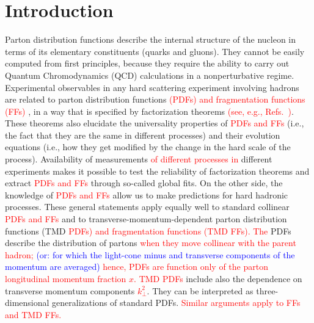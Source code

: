 \documentclass[aps,preprintnumbers,showpacs,nofootinbib,superscriptaddress,floatfix]{revtex4}
\newcommand{\T}{\perp}
\begin{document}

\maketitle

\section{Introduction}
\label{s:intro}

Parton distribution functions describe the internal structure of the nucleon
in terms of its elementary constituents (quarks and gluons). They cannot be
easily computed from first principles, because they require the ability to
carry out Quantum Chromodynamics (QCD) calculations in a nonperturbative
regime. Experimental observables in any hard scattering experiment
involving hadrons are related to parton distribution functions \textcolor{red}{(PDFs) and fragmentation functions (FFs)} , in a way that is specified by factorization theorems \textcolor{red}{(see, e.g., Refs.~\cite{Collins:1989gx,Collins:2011zzd})}. These theorems also elucidate the universality properties of \textcolor{red}{PDFs and FFs} (i.e., the fact that they are the same in different processes) and their evolution equations (i.e., how they get modified by the change in
the hard scale of the process). Availability of measurements \textcolor{red}{of different processes in} different
experiments makes it possible to test the reliability of factorization theorems and extract \textcolor{red}{PDFs and FFs} through so-called global fits. On the other side, the knowledge of \textcolor{red}{PDFs and FFs} allow us
to make predictions for hard hadronic processes. These general statements apply equally well to
standard collinear \textcolor{red}{PDFs and FFs} and to transverse-momentum-dependent parton distribution functions (TMD \textcolor{red}{PDFs) and fragmentation functions (TMD FFs). The} PDFs
describe the distribution of partons \textcolor{red}{when they move collinear with the parent hadron;} \textcolor{blue}{(or: for which the light-cone minus and transverse components of the momentum are averaged)} \textcolor{red}{hence, PDFs are function only of the parton longitudinal momentum fraction $x$. TMD PDFs} include also the dependence on transverse momentum components \textcolor{red}{$k_{\T}^2$}. They can be interpreted as three-dimensional generalizations of standard PDFs. \textcolor{red}{Similar arguments apply to FFs and TMD FFs. }
\end{document}
